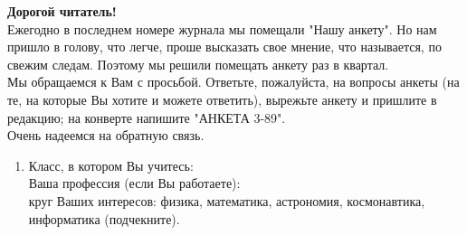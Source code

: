 \documentclass[twocolumn,4pt]{article}
\begin{document}
\textbf{Дорогой читатель!} \\
Ежегодно в последнем номере журнала мы помещали "Нашу анкету". Но нам пришло в голову, что легче, проше высказать свое мнение, что называется, по свежим следам. Поэтому мы решили помещать анкету раз в квартал. \\
Мы обращаемся к Вам с просьбой. Ответьте, пожалуйста, на вопросы анкеты (на те, на которые Вы хотите и можете ответить), вырежьте анкету и пришлите в редакцию; на конверте напишите "АНКЕТА 3-89". \\
Очень надеемся на обратную связь. \\
\begin{enumerate}
    \item Класс, в котором Вы учитесь: \underline{\phantom{a}}\underline{\phantom{a}}\underline{\phantom{a}}\underline{\phantom{a}}\underline{\phantom{a}}\underline{\phantom{a}}\underline{\phantom{a}}\underline{\phantom{a}}\underline{\phantom{a}}\underline{\phantom{a}}\underline{\phantom{a}}\underline{\phantom{a}}\underline{\phantom{a}}\underline{\phantom{a}}\underline{\phantom{a}}\underline{\phantom{a}} \\
    Ваша профессия (если Вы работаете): \underline{\phantom{a}}\underline{\phantom{a}}\underline{\phantom{a}}\underline{\phantom{a}}\underline{\phantom{a}}\underline{\phantom{a}}\underline{\phantom{a}} \underline{\phantom{a}}\underline{\phantom{a}}\underline{\phantom{a}}\underline{\phantom{a}}\underline{\phantom{a}}\underline{\phantom{a}}\underline{\phantom{a}}\underline{\phantom{a}}\underline{\phantom{a}}\underline{\phantom{a}}\underline{\phantom{a}}\underline{\phantom{a}}\underline{\phantom{a}}\underline{\phantom{a}}\underline{\phantom{a}}\underline{\phantom{a}}\underline{\phantom{a}}\underline{\phantom{a}}\underline{\phantom{a}}\underline{\phantom{a}}\underline{\phantom{a}}\underline{\phantom{a}}\underline{\phantom{a}}\underline{\phantom{a}}\underline{\phantom{a}}\underline{\phantom{a}}\underline{\phantom{a}}\underline{\phantom{a}}\underline{\phantom{a}}\underline{\phantom{a}}\underline{\phantom{a}}\underline{\phantom{a}}\underline{\phantom{a}}\underline{\phantom{a}}\underline{\phantom{a}}\underline{\phantom{a}}\underline{\phantom{a}}\underline{\phantom{a}}\underline{\phantom{a}}\underline{\phantom{a}}\underline{\phantom{a}}\underline{\phantom{a}}\underline{\phantom{a}}\underline{\phantom{a}} \\
    круг Ваших интересов: физика, математика, астрономия, космонавтика, информатика (подчекните).
    

\end{enumerate}
\end{document}
